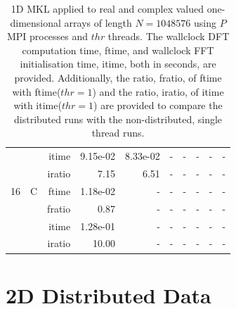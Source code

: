 \documentclass[a4paper]{article}
\begin{document}
\begin{table}[htbp]
\begin{center}
\begin{small}
\begin{tabular}{|r|r|r|r|r|r|r|r|r|r|}
          &      & itime & 9.15e-02 & 8.33e-02 &     -     &     -     &     -     &     -     &     -     \\   
          &      & iratio & 7.15 & 6.51 &     -     &     -     &     -     &     -     &     -     \\ \hline 
     16 & C & ftime & 1.18e-02 &     -     &     -     &     -     &     -     &     -     &     -     \\   
          &      & fratio & 0.87 &     -     &     -     &     -     &     -     &     -     &     -     \\   
          &      & itime & 1.28e-01 &     -     &     -     &     -     &     -     &     -     &     -     \\   
          &      & iratio & 10.00 &     -     &     -     &     -     &     -     &     -     &     -     \\ \hline 
   \end{tabular}
\caption{1D MKL applied to real and complex valued one-dimensional arrays of length $N=1048576$ using $P$ MPI processes and $thr$ threads. The wallclock DFT computation time, ftime, and wallclock FFT initialisation time, itime, both in seconds, are provided. Additionally, the ratio, fratio, of ftime  with ftime($thr=1$) and the ratio, iratio, of itime  with itime($thr=1$) are provided to compare the distributed runs with the non-distributed, single thread runs.  }\label{TblMKL1d1048576}
\end{small}
\end{center}
\end{table}

\clearpage

\section{2D Distributed Data}\label{App:2Ddist}
\end{document}
